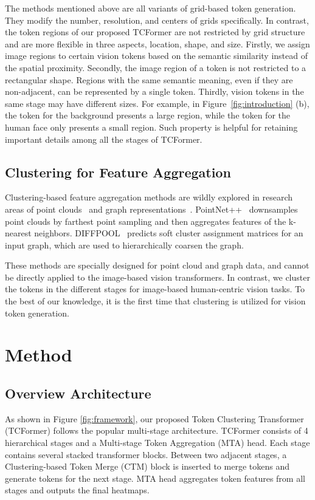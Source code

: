 \documentclass[10pt,twocolumn,letterpaper]{article}
\begin{document}
The methods mentioned above are all variants of grid-based token generation. They modify the number, resolution, and centers of grids specifically. 
In contrast, the token regions of our proposed TCFormer are not restricted by grid structure and are more flexible in three aspects, \ie location, shape, and size.
Firstly, we assign image regions to certain vision tokens based on the semantic similarity instead of the spatial proximity. 
Secondly, the image region of a token is not restricted to a rectangular shape. Regions with the same semantic meaning, even if they are non-adjacent, can be represented by a single token.
Thirdly, vision tokens in the same stage may have different sizes. 
For example, in Figure~\ref{fig:introduction} (b), the token for the background presents a large region, while the token for the human face only presents a small region. Such property is helpful for retaining important details among all the stages of TCFormer.




\subsection{Clustering for Feature Aggregation}
Clustering-based feature aggregation methods are wildly explored in research areas of point clouds~\cite{qi2017pointnet++} and graph representations~\cite{ying2018hierarchical}.
PointNet++~\cite{qi2017pointnet++} downsamples point clouds by farthest point sampling and then aggregates features of the k-nearest neighbors.
DIFFPOOL~\cite{ying2018hierarchical} predicts soft cluster assignment matrices for an input graph, which are used to hierarchically coarsen the graph. 

These methods are specially designed for point cloud and graph data, and cannot be directly applied to the image-based vision transformers.
In contrast, we cluster the tokens in the different stages for image-based human-centric vision tasks.
To the best of our knowledge, it is the first time that clustering is utilized for vision token generation.

 

\section{Method}


\subsection{Overview Architecture}
As shown in Figure \ref{fig:framework}, our proposed Token Clustering Transformer (TCFormer) follows the popular multi-stage architecture.
TCFormer consists of 4 hierarchical stages and a Multi-stage Token Aggregation (MTA) head. 
Each stage contains several stacked transformer blocks.
Between two adjacent stages, a Clustering-based Token Merge (CTM) block is inserted to merge tokens and generate tokens for the next stage.
MTA head aggregates token features from all stages and outputs the final heatmaps.
\end{document}
